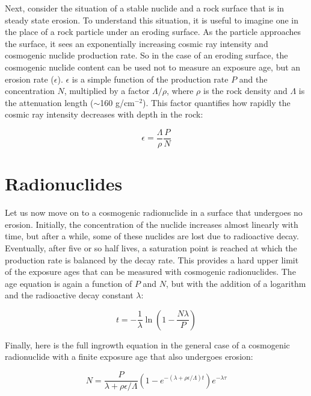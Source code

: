 Next, consider the situation of a stable nuclide and a rock surface
that is in steady state erosion. To understand this situation, it is
useful to imagine one in the place of a rock particle under an eroding
surface. As the particle approaches the surface, it sees an
exponentially increasing cosmic ray intensity and cosmogenic nuclide
production rate. So in the case of an eroding surface, the cosmogenic
nuclide content can be used not to measure an exposure age, but an
erosion rate ($\epsilon$). $\epsilon$ is a simple function of the
production rate $P$ and the concentration $N$, multiplied by a factor
$\Lambda/\rho$, where $\rho$ is the rock density and $\Lambda$ is the
attenuation length ($\sim$160 g/cm$^{-2}$).  This factor quantifies
how rapidly the cosmic ray intensity decreases with depth in the rock:

\begin{equation}
\epsilon = \frac{\Lambda}{\rho} \frac{P}{N}
\label{eq:cosmo-erosion}
\end{equation}

\section{Radionuclides}

Let us now move on to a cosmogenic radionuclide in a surface that
undergoes no erosion. Initially, the concentration of the nuclide
increases almost linearly with time, but after a while, some of these
nuclides are lost due to radioactive decay. Eventually, after five or
so half lives, a saturation point is reached at which the production
rate is balanced by the decay rate. This provides a hard upper limit
of the exposure ages that can be measured with cosmogenic
radionuclides. The age equation is again a function of $P$ and $N$,
but with the addition of a logarithm and the radioactive decay
constant $\lambda$:

\begin{equation}
t = -\frac{1}{\lambda} \ln\left(1-\frac{N\lambda}{P}\right)
\label{eq:cosmo-radioexposure}
\end{equation}

Finally, here is the full ingrowth equation in the general case of a
cosmogenic radionuclide with a finite exposure age that also undergoes
erosion:

\begin{equation}
N = \frac{P}{\lambda + \rho\epsilon/\Lambda}
\left(1-e^{-(\lambda+\rho\epsilon/\Lambda)t}\right) e^{-\lambda\tau}
\label{eq:cosmo-N}
\end{equation}

